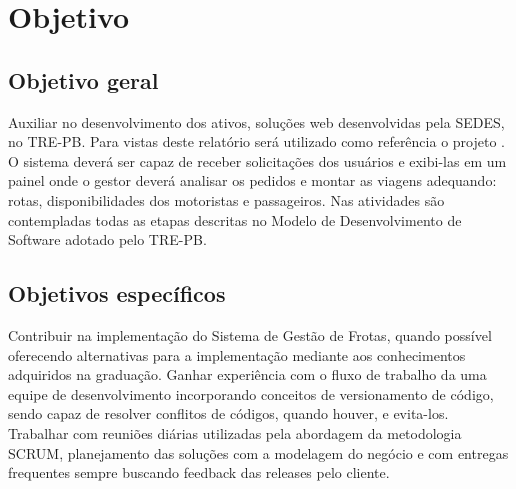 

\section{Objetivo}
\label{sec:objetivo}

\subsection{Objetivo geral}
\label{sec:objetivoGeral}
Auxiliar no desenvolvimento dos ativos, soluções web desenvolvidas pela SEDES, no TRE-PB.  Para vistas deste relatório será utilizado como referência o projeto \imprimirtitulo. O sistema deverá ser capaz de receber solicitações dos usuários e exibi-las em um painel onde o gestor deverá analisar os pedidos e montar as viagens adequando: rotas, disponibilidades dos motoristas e passageiros. Nas atividades são contempladas todas as etapas descritas no Modelo de Desenvolvimento de Software adotado pelo TRE-PB.

\subsection{Objetivos específicos}
\label{sec:objetivosEspecificos}
Contribuir na implementação do Sistema de Gestão de Frotas, quando possível oferecendo alternativas para a implementação mediante aos conhecimentos adquiridos na graduação. Ganhar experiência com o fluxo de trabalho da uma equipe de desenvolvimento incorporando conceitos de versionamento de código, sendo capaz de resolver conflitos de códigos, quando houver, e evita-los. Trabalhar com reuniões diárias utilizadas pela abordagem da metodologia SCRUM, planejamento das soluções com a modelagem do negócio e com entregas frequentes sempre buscando feedback das releases pelo cliente. 



